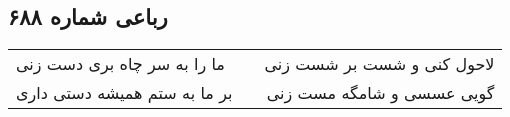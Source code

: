 \begin{center}
\section*{رباعی شماره ۶۸۸}
\label{sec:sh688}
\begin{longtable}{l p{0.5cm} r}
ما را به سر چاه بری دست زنی
&&
لاحول کنی و شست بر شست زنی
\\
بر ما به ستم همیشه دستی داری
&&
گویی عسسی و شامگه مست زنی
\\
\end{longtable}
\end{center}
